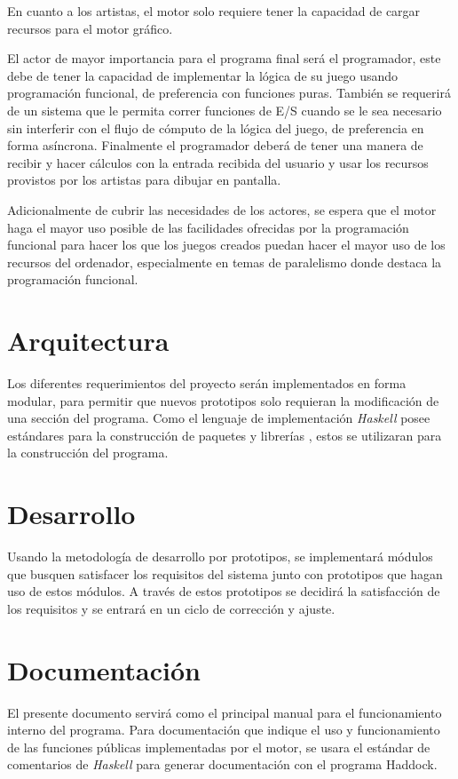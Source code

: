 En cuanto a los artistas, el motor solo requiere tener la capacidad de cargar recursos para el motor gráfico.

El actor de mayor importancia para el programa final será el programador, este debe de tener la capacidad de implementar la lógica de su juego usando programación funcional, de preferencia con funciones puras. También se requerirá de un sistema que le permita correr funciones de E/S cuando se le sea necesario sin interferir con el flujo de cómputo de la lógica del juego, de preferencia en forma asíncrona. Finalmente el programador deberá de tener una manera de recibir y hacer cálculos con la entrada recibida del usuario y usar los recursos provistos por los artistas para dibujar en pantalla.

Adicionalmente de cubrir las necesidades de los actores, se espera que el motor haga el mayor uso posible de las facilidades ofrecidas por la programación funcional para hacer los que los juegos creados puedan hacer el mayor uso de los recursos del ordenador, especialmente en temas de paralelismo donde destaca la programación funcional.

\section{Arquitectura}

Los diferentes requerimientos del proyecto serán implementados en forma modular, para permitir que nuevos prototipos solo requieran la modificación de una sección del programa. Como el lenguaje de implementación \emph{Haskell} posee estándares para la construcción de paquetes y librerías \cite{wiki:WriteAHaskellProgram}, estos se utilizaran para la construcción del programa.

\section{Desarrollo}

Usando la metodología de desarrollo por prototipos, se implementará módulos que busquen satisfacer los requisitos del sistema junto con prototipos que hagan uso de estos módulos. A través de estos prototipos se decidirá la satisfacción de los requisitos y se entrará en un ciclo de corrección y ajuste.

\section{Documentación}

El presente documento servirá como el principal manual para el funcionamiento interno del programa. Para documentación que indique el uso y funcionamiento de las funciones públicas implementadas por el motor, se usara el estándar de comentarios de \emph{Haskell} para generar documentación con el programa Haddock.
